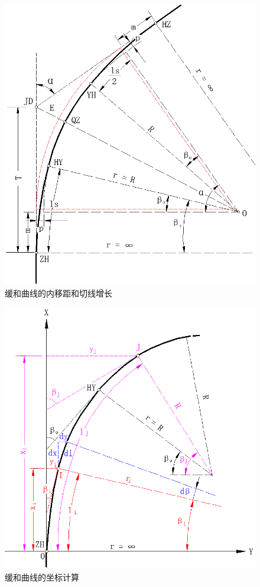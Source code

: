 \begin{figure}[htbp]
    \centering
    \includegraphics[scale=0.6]{route/HY02.png}
    \caption{缓和曲线的内移距和切线增长}
    \label{fig:HY02}
\end{figure}


\begin{figure}[htbp]
    \centering
    \includegraphics[scale=0.6]{route/HY03.png}
    \caption{缓和曲线的坐标计算}
    \label{fig:HR03}
\end{figure}

